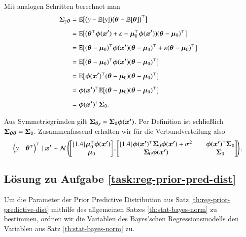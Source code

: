 Mit analogen Schritten berechnet man
\begin{align*}
	\bm{\Sigma}_{y \bm{\theta}}
		&= \mathbb{E}\bigl[ \bigl( y - \mathbb{E}[y] \bigr) \bigl( \bm{\theta} - \mathbb{E}[\bm{\theta}] \bigr)^\top \bigr]
\\[2mm]
		&= \mathbb{E}\bigl[ \bigl( \bm{\theta}^\top \bm{\phi}(\bm{x'}) + \varepsilon - \bm{\mu}_0^\top \bm{\phi}(\bm{x'}) \bigr) (\bm{\theta} - \bm{\mu}_0)^\top \bigr]
\\[2mm]
		&= \mathbb{E}\bigl[
			(\bm{\theta} - \bm{\mu}_0)^\top \bm{\phi}(\bm{x'}) (\bm{\theta} - \bm{\mu}_0)^\top + \varepsilon (\bm{\theta} - \bm{\mu}_0)^\top
		\bigr]
\\[2mm]
		&= \mathbb{E}\bigl[ (\bm{\theta} - \bm{\mu}_0)^\top \bm{\phi}(\bm{x'}) (\bm{\theta} - \bm{\mu}_0)^\top \bigr]
\\[2mm]
		&= \mathbb{E}\bigl[ \bm{\phi}(\bm{x'})^\top (\bm{\theta} - \bm{\mu}_0) (\bm{\theta} - \bm{\mu}_0)^\top \bigr]
\\[2mm]
		&= \bm{\phi}(\bm{x'})^\top \mathbb{E}\bigl[ (\bm{\theta} - \bm{\mu}_0) (\bm{\theta} - \bm{\mu}_0)^\top \bigr]
\\[2mm]
		&= \bm{\phi}(\bm{x'})^\top \bm{\Sigma}_0.
\end{align*}

Aus Symmetriegründen gilt $\bm{\Sigma}_{\bm{\theta} y} = \bm{\Sigma}_0 \bm{\phi}(\bm{x'})$. Per Definition ist schließlich $\bm{\Sigma}_{\bm{\theta} \bm{\theta}} = \bm{\Sigma}_0$. Zusammenfassend erhalten wir für die Verbundverteilung also
\begin{equation*}
	\begin{pmatrix} y & \bm{\theta}^\top \end{pmatrix}^\top \mid \bm{x'} \sim \mathcal{N}\left(
		\begin{bmatrix}[1.4]
			\bm{\mu}_0^\top \bm{\phi}(\bm{x'}) \\
			\bm{\mu}_0
		\end{bmatrix},
		\begin{bmatrix}[1.4]
			\bm{\phi}(\bm{x'})^\top \bm{\Sigma}_0 \bm{\phi}(\bm{x'}) + \sigma^2 \quad 	& \bm{\phi}(\bm{x'})^\top \bm{\Sigma}_0 		\\
			\bm{\Sigma}_0 \bm{\phi}(\bm{x'}) \quad 							& \bm{\Sigma}_0
		\end{bmatrix}
	\right).
\end{equation*}


\subsection*{Lösung zu Aufgabe \ref{task:reg-prior-pred-dist}}

Um die Parameter der Prior Predictive Distribution aus Satz \ref{th:reg-prior-predictive-dist} mithilfe des allgemeinen Satzes \ref{th:stat-bayes-norm} zu bestimmen, ordnen wir die Variablen des Bayes'schen Regressionsmodells den Variablen aus Satz \ref{th:stat-bayes-norm} zu.

